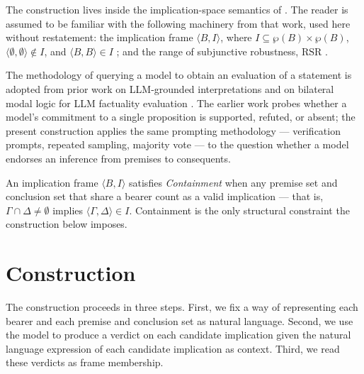 \documentclass[11pt]{article}
\begin{document}
The construction lives inside the implication-space semantics of \cite{hlobil2025}. The reader is assumed to be familiar with the following machinery from that work, used here without restatement: the implication frame $\langle B, I \rangle$, where $I \subseteq \wp(B) \times \wp(B)$, $\langle \emptyset, \emptyset \rangle \notin I$, and $\langle B, B \rangle \in I$ \cite[Def.~62]{hlobil2025}; and the range of subjunctive robustness, $\mathrm{RSR}$ \cite[Def.~63]{hlobil2025}. 

The methodology of querying a model to obtain an evaluation of a statement is adopted from prior work on LLM-grounded interpretations \cite{allen2025nesy} and on bilateral modal logic for LLM factuality evaluation \cite{allen2026bbl}. The earlier work probes whether a model's commitment to a single proposition is supported, refuted, or absent; the present construction applies the same prompting methodology --- verification prompts, repeated sampling, majority vote --- to the question whether a model endorses an inference from premises to consequents.

An implication frame $\langle B, I \rangle$ satisfies \emph{Containment} when any premise set and conclusion set that share a bearer count as a valid implication --- that is, $\Gamma \cap \Delta \neq \emptyset$ implies $\langle \Gamma, \Delta \rangle \in I$. Containment is the only structural constraint the construction below imposes.

\section{Construction}

The construction proceeds in three steps. First, we fix a way of representing each bearer and each premise and conclusion set as natural language. Second, we use the model to produce a verdict on each candidate implication given the natural language expression of each candidate implication as context. Third, we read these verdicts as frame membership.
\end{document}
